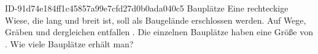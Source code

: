 \begin{exercise}
      {ID-91d74e184ff1c45857a99e7cfd27d0b0ada040c5}
      {Bauplätze}
  \ifproblem\problem
    Eine rechteckige Wiese, die  lang und  breit ist, soll
    als Baugelände erschlossen werden. Auf Wege, Gräben und dergleichen entfallen
    . Die einzelnen Bauplätze haben eine Größe von .
    Wie viele Bauplätze erhält man?
  \fi
\end{exercise}
